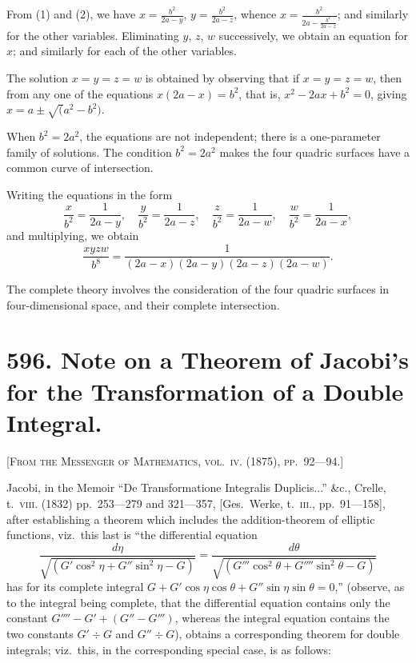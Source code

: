 \documentclass[11pt,a4paper]{article}
\theoremstyle{plain}
\theoremstyle{definition}
\theoremstyle{remark}
\begin{document}
From (1) and (2), we have $x = \frac{b^2}{2a - y}$, $y = \frac{b^2}{2a - z}$, whence $x = \frac{b^2}{2a - \frac{b^2}{2a - z}}$; and similarly for the other variables. Eliminating $y$, $z$, $w$ successively, we obtain an equation for $x$; and similarly for each of the other variables.

The solution $x = y = z = w$ is obtained by observing that if $x = y = z = w$, then from any one of the equations $x(2a - x) = b^2$, that is, $x^2 - 2ax + b^2 = 0$, giving $x = a \pm \surd(a^2 - b^2)$.

When $b^2 = 2a^2$, the equations are not independent; there is a one-parameter family of solutions. The condition $b^2 = 2a^2$ makes the four quadric surfaces have a common curve of intersection.

Writing the equations in the form
\[
\frac{x}{b^2} = \frac{1}{2a - y},\quad \frac{y}{b^2} = \frac{1}{2a - z},\quad \frac{z}{b^2} = \frac{1}{2a - w},\quad \frac{w}{b^2} = \frac{1}{2a - x},
\]
and multiplying, we obtain
\[
\frac{xyzw}{b^8} = \frac{1}{(2a - x)(2a - y)(2a - z)(2a - w)}.
\]

The complete theory involves the consideration of the four quadric surfaces in four-dimensional space, and their complete intersection.

\newpage

\section*{596. Note on a Theorem of Jacobi's for the Transformation of a Double Integral.}

\noindent\textsc{[From the Messenger of Mathematics, vol.~\textsc{iv}. (1875), pp.~92---94.]}

\medskip

\noindent Jacobi, in the Memoir ``De Transformatione Integralis Duplicis...'' \&c., Crelle, t.~\textsc{viii}. (1832) pp.~253---279 and 321---357, [Ges.\ Werke, t.~\textsc{iii}., pp.~91---158], after establishing a theorem which includes the addition-theorem of elliptic functions, viz.\ this last is ``the differential equation
\[
\frac{d\eta}{\sqrt{(G' \cos^2 \eta + G'' \sin^2 \eta - G)}} = \frac{d\theta}{\sqrt{(G''' \cos^2 \theta + G'''' \sin^2 \theta - G)}}
\]
has for its complete integral $G + G' \cos \eta \cos \theta + G'' \sin \eta \sin \theta = 0$,'' (observe, as to the integral being complete, that the differential equation contains only the constant $G'''' - G' + (G'' - G''')$, whereas the integral equation contains the two constants $G' \div G$ and $G'' \div G$), obtains a corresponding theorem for double integrals; viz.\ this, in the corresponding special case, is as follows:
\end{document}
